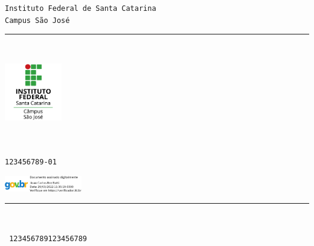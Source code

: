 \documentclass[11pt,a4paper]{memoir}
\begin{document}
    \begin{Spacing}{0.75}%
    \noindent
    \texttt{\fontsize{4mm}{5mm}\selectfont Instituto Federal de Santa Catarina}\\
    \texttt{\fontsize{3mm}{4mm}\selectfont Campus São José}\\ 
    \rule{74mm}{.3mm}\\
    \begin{minipage}[t]{33mm}
        \vspace{-2mm}%
        \hspace{-4mm}\includegraphics[height=25mm]{logo-ifsc-saojose.png}
    \end{minipage}
    \hspace{1mm}
    \begin{minipage}[t]{42mm}
        \vspace{-4mm}%
        \begin{flushleft}
        {\scriptsize
            \begin{Spacing}{1}%
            \vspace{1mm}
            \hspace{-17mm}\texttt{\fontsize{2.6mm}{2mm}}\\
            \hspace{-17mm}\texttt{\fontsize{2.6mm}{2mm}}\\
            \hspace{-17mm}\texttt{\fontsize{2.6mm}{2mm}123456789-01}
            \end{Spacing}
        }
    \begin{minipage}[t]{33mm}
        \vspace{-1mm}%
        \includegraphics[height=7mm]{assinatura.png}
    \end{minipage}
        \end{flushleft}
    \end{minipage}
    \vspace{-0.5mm}
    \rule{74mm}{0.3mm}\\
    \end{Spacing}
    \vspace{-5mm} \hspace{40mm} \texttt{\fontsize{2mm}{3mm} 123456789123456789}
\end{document}
